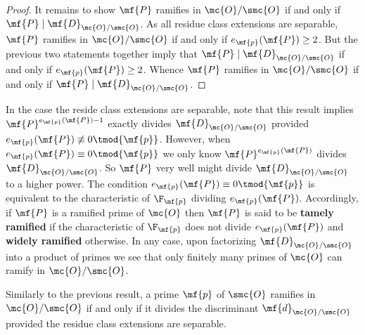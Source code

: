 \documentclass[12pt]{article}
\begin{document}
\begin{proof}
        It remains to show \(\mf{P}\) ramifies in \(\mc{O}/\smc{O}\) if and only if \(\mf{P} \mid \mf{D}_{\mc{O}/\smc{O}}\). As all residue class extensions are separable, \(\mf{P}\) ramifies in \(\mc{O}/\smc{O}\) if and only if \(e_{\mf{p}}(\mf{P}) \ge 2\). But the previous two statements together imply that \(\mf{P} \mid \mf{D}_{\mc{O}/\smc{O}}\) if and only if \(e_{\mf{p}}(\mf{P}) \ge 2\). Whence \(\mf{P}\) ramifies in \(\mc{O}/\smc{O}\) if and only if \(\mf{P} \mid \mf{D}_{\mc{O}/\smc{O}}\).
      \end{proof}

      In the case the reside class extensions are separable, note that this result implies \(\mf{P}^{e_{\mf{p}}(\mf{P})-1}\) exactly divides \(\mf{D}_{\mc{O}/\smc{O}}\) provided \(e_{\mf{p}}(\mf{P}) \not\equiv 0 \tmod{\mf{p}}\). However, when \(e_{\mf{p}}(\mf{P}) \equiv 0 \tmod{\mf{p}}\) we only know \(\mf{P}^{e_{\mf{p}}(\mf{P})}\) divides \(\mf{D}_{\mc{O}/\smc{O}}\). So \(\mf{P}\) very well might divide \(\mf{D}_{\mc{O}/\smc{O}}\) to a higher power. The condition \(e_{\mf{p}}(\mf{P}) \equiv 0 \tmod{\mf{p}}\) is equivalent to the characteristic of \(\F_{\mf{p}}\) dividing \(e_{\mf{p}}(\mf{P})\). Accordingly, if \(\mf{P}\) is a ramified prime of \(\mc{O}\) then \(\mf{P}\) is said to be \textbf{tamely ramified} if the characteristic of \(\F_{\mf{p}}\) does not divide \(e_{\mf{p}}(\mf{P})\) and \textbf{widely ramified} otherwise. In any case, upon factorizing \(\mf{D}_{\mc{O}/\smc{O}}\) into a product of primes we see that only finitely many primes of \(\mc{O}\) can ramify in \(\mc{O}/\smc{O}\).

      Similarly to the previous result, a prime \(\mf{p}\) of \(\smc{O}\) ramifies in \(\mc{O}/\smc{O}\) if and only if it divides the discriminant \(\mf{d}_{\mc{O}/\smc{O}}\) provided the residue class extensions are separable.
\end{document}
